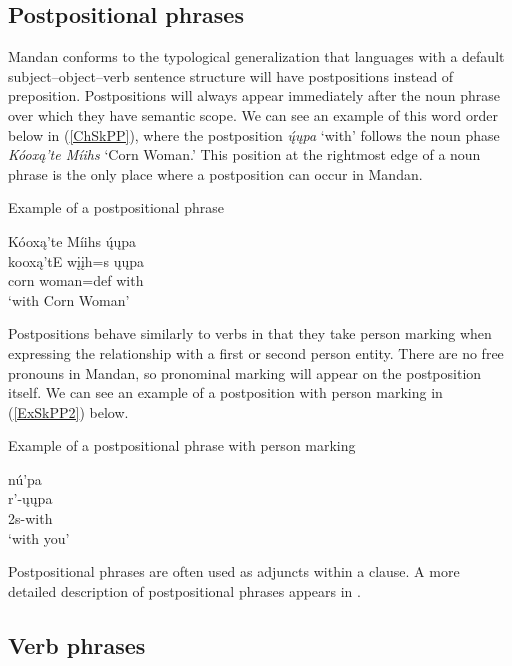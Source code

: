 \subsection{Postpositional phrases}\label{CHSk5.2}

Mandan conforms to the typological generalization that languages with a default subject--object--verb sentence structure will have postpositions instead of preposition. Postpositions will always appear immediately after the noun phrase over which they have semantic scope. We can see an example of this word order below in (\ref{ChSkPP}), where the postposition \textit{ų́ųpa} `with' follows the noun phase \textit{Kóoxą'te Míihs} `Corn Woman.' This position at the rightmost edge of a noun phrase is the only place where a postposition can occur in Mandan.

\begin{exe}
    \item\label{ChSkPP} Example of a postpositional phrase

    \glll Kóoxą'te Míihs ų́ųpa\\
    kooxą'tE wįįh=s ųųpa\\
    \textnormal{corn} \textnormal{woman}=def \textnormal{with}\\
    \glt `with Corn Woman' \citep[112]{hollow1973a}
\end{exe}

Postpositions behave similarly to verbs in that they take person marking when expressing the relationship with a first or second person entity. There are no free pronouns in Mandan, so pronominal marking will appear on the postposition itself. We can see an example of a postposition with person marking in (\ref{ExSkPP2}) below.

\begin{exe}
    \item\label{ExSkPP2} Example of a postpositional phrase with person marking

    \glll nú'pa\\
        r'-ųųpa\\
        2s-\textnormal{with}\\
        \glt `with you' \citep[224]{hollow1973b}
\end{exe}

Postpositional phrases are often used as adjuncts within a clause. A more detailed description of postpositional phrases appears in .

\subsection{Verb phrases}\label{CHSk5.3}


